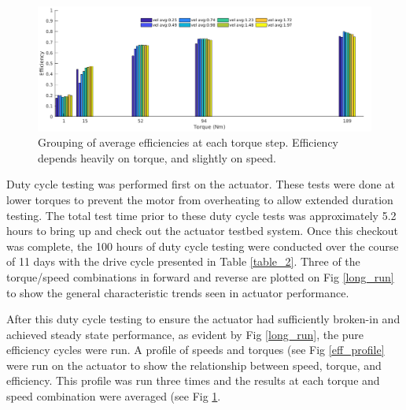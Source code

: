 
\begin{figure}[t]
   \centering
   \includegraphics[width=0.8\linewidth]{images/eff_test_bar_plot_v3}
   \caption{Grouping of average efficiencies at each torque step.
   Efficiency depends heavily on torque, and slightly on speed.}
   \label{eff_results}
\end{figure}

Duty cycle testing was performed first on the actuator.
These tests were done at lower torques to prevent the motor from overheating to allow extended duration testing.
The total test time prior to these duty cycle tests was approximately 5.2 hours to bring up and check out the actuator testbed system.
Once this checkout was complete, the 100 hours of duty cycle testing were conducted over the course of 11 days with the drive cycle presented in Table \ref{table_2}.
Three of the torque/speed combinations in forward and reverse are plotted on Fig \ref{long_run} to show the general characteristic trends seen in actuator performance.

After this duty cycle testing to ensure the actuator had sufficiently broken-in and achieved steady state performance, as evident by Fig \ref{long_run}, the pure efficiency cycles were run.
A profile of speeds and torques (see Fig \ref{eff_profile} were run on the actuator to show the relationship between speed, torque, and efficiency.
This profile was run three times and the results at each torque and speed combination were averaged (see Fig \ref{eff_results}.
